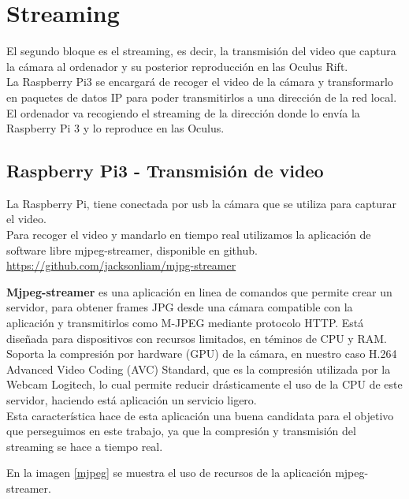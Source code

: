 \documentclass[twoside, 11pt]{epstfg}
\begin{document}
\section{Streaming}
El segundo bloque es el streaming, es decir, la transmisión del video que captura la cámara al ordenador y su posterior reproducción en las Oculus Rift.\\
La Raspberry Pi3 se encargará de recoger el video de la cámara y transformarlo en paquetes de datos IP para poder transmitirlos a una dirección de la red local.\\El ordenador va recogiendo el streaming de la dirección donde lo envía la Raspberry Pi 3 y lo reproduce en las Oculus.

\subsection{Raspberry Pi3 - Transmisión de video}
La Raspberry Pi, tiene conectada por usb la cámara que se utiliza para capturar el video.\\
Para recoger el video y mandarlo en tiempo real utilizamos la aplicación de software libre mjpeg-streamer, disponible en github. \url{https://github.com/jacksonliam/mjpg-streamer}

\textbf{Mjpeg-streamer} es una aplicación en linea de comandos que permite crear un servidor, para obtener frames JPG desde una cámara compatible con la aplicación y transmitirlos como M-JPEG mediante protocolo HTTP. Está diseñada para dispositivos con recursos limitados, en téminos de CPU y RAM.\\
Soporta la compresión por hardware (GPU) de la cámara, en nuestro caso H.264 Advanced Video Coding (AVC) Standard, que es la compresión utilizada por la Webcam Logitech, lo cual permite reducir drásticamente el uso de la CPU de este servidor, haciendo está aplicación un servicio ligero.\\
Esta característica hace de esta aplicación una buena candidata para el objetivo que perseguimos en este trabajo, ya que la compresión y transmisión del streaming se hace a tiempo real.

En la imagen \ref{mjpeg} se muestra el uso de recursos de la aplicación mjpeg-streamer.
\end{document}
